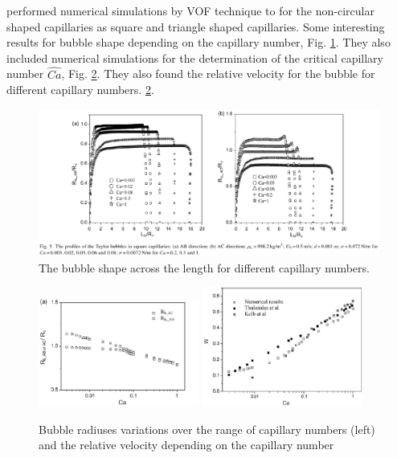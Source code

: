 \documentclass{article}
\begin{document}
\citet{wang-non-circular} performed numerical simulations by VOF technique to for the non-circular
shaped capillaries as square and triangle shaped capillaries. Some interesting results for bubble
shape depending on the capillary number, Fig. \ref{fig:wang:bubble:shape}. They also included
numerical simulations for the determination of the critical capillary number $\hat{Ca}$, Fig.
\ref{fig:wang:critical:capillary}. They also found the relative velocity for the bubble for
different capillary numbers. \ref{fig:wang:critical:capillary}.
\begin{figure}
\includegraphics[width=\textwidth]{Figures/wang_bubble_shape.eps}
\caption{The bubble shape across the length for different capillary numbers.
\label{fig:wang:bubble:shape}}
\end{figure}
\begin{figure}
\includegraphics[width=0.47\textwidth]{Figures/wang_critical_capillary.eps}\hfill
\includegraphics[width=0.47\textwidth]{Figures/wang_relative_velocity.eps}
\caption{Bubble radiuses variations over the range of capillary numbers (left) and the relative
velocity depending on the capillary number  \label{fig:wang:critical:capillary}}
\end{figure}
\end{document}
